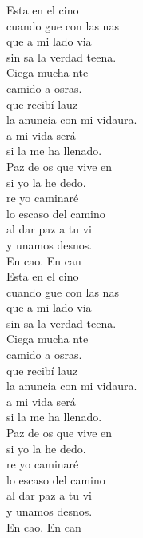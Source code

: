 \documentclass[12pt]{article}
\begin{document}
\begin{multicols*}{2}
\begin{cancion}%
	Esta en el cino \\
	cuando gue con las nas\\
	 que a mi lado via \\
	sin sa la verdad teena.\\
\jump
	Ciega mucha nte \\
	camido a osras.\\
	que recibí lauz \\
	la anuncia con mi vidaura.\\
\jump
	a mi vida será\\
	si la  me ha llenado. \\
	Paz de os que vive en  \\
	si yo la he dedo.\\
\jump
	re yo caminaré \\
	lo escaso del camino\\
	al dar  paz a tu vi \\
	y unamos desnos.\\
\jump
	En cao. En can\\
\jump
	Esta en el cino \\
	cuando gue con las nas\\
	 que a mi lado via \\
	sin sa la verdad teena.\\
\jump
	Ciega mucha nte \\
	camido a osras.\\
	que recibí lauz \\
	la anuncia con mi vidaura.\\
\jump
	a mi vida será\\
	si la  me ha llenado. \\
	Paz de os que vive en  \\
	si yo la he dedo.\\
\jump
	re yo caminaré \\
	lo escaso del camino\\
	al dar  paz a tu vi \\
	y unamos desnos.\\
\jump
	En cao. En can\\
\end{cancion}%


\end{multicols*}
\end{document}
